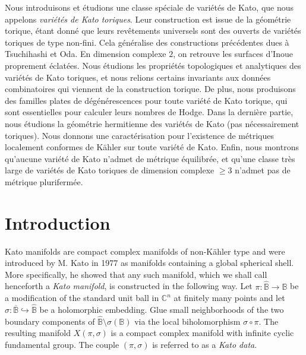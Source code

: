 \documentclass[JEP,XML,SOM,Unicode,NoFloatCountersInSection]{cedram}
\theoremstyle{definition}
\let\sminus\setminus
\newcommand{\BB}{\mathbb{B}}
\newcommand{\CC}{\mathbb{C}}
\begin{document}




\begin{altabstract}
Nous introduisons et étudions une classe spéciale de variétés de Kato, que nous appelons \emph{variétés de Kato toriques}. Leur construction est issue de la géométrie torique, étant donné que leurs revêtements universels sont des ouverts de variétés toriques de type non-fini. Cela généralise des constructions précédentes dues à Tsuchihashi et Oda. En dimension complexe $2$, on retrouve les surfaces d'Inoue proprement éclatées.
Nous étudions les propriétés topologiques et analytiques des variétés de Kato toriques, et nous relions certains invariants aux données combinatoires qui viennent de la construction torique. De plus, nous produisons des familles plates de dégénérescences pour toute variété de Kato torique, qui sont essentielles pour calculer leurs nombres de Hodge. Dans la dernière partie, nous étudions la géométrie hermitienne des variétés de Kato (pas nécessairement toriques). Nous donnons une caractérisation pour l'existence de métriques localement conformes de Kähler sur toute variété de Kato. Enfin, nous montrons qu'aucune variété de Kato n'admet de métrique équilibrée, et qu'une classe très large de variétés de Kato toriques de dimension complexe $\geq 3$ n'admet pas de métrique plurifermée.
\end{altabstract}

\maketitle
\vspace*{-\baselineskip}
\tableofcontents
\mainmatter

\vspace*{-3\baselineskip}\enlargethispage{.5\baselineskip}
\mbox{}
\section{Introduction}

Kato manifolds are compact complex manifolds of non-Kähler type and were introduced by M. Kato in 1977 \cite{kato} as manifolds containing a global spherical shell. More specifically, he showed that any such manifold, which we shall call henceforth a \emph{Kato manifold}, is constructed in the following way. Let $\pi: \hat{\BB} \to \BB$ be a
modification of the standard unit ball in $\CC^n$ at finitely many points and let $\sigma: \overline{\BB} \hookrightarrow \hat{\BB}$ be a holomorphic embedding. Glue small neighborhoods of the two boundary components of $\hat{\BB} \sminus \sigma(\BB)$ via the local biholomorphism $\sigma \circ \pi$. The resulting manifold $X(\pi,\sigma)$ is a compact complex manifold with infinite cyclic fundamental group. The couple $(\pi, \sigma)$ is referred to as a \emph{Kato data}.
\end{document}
